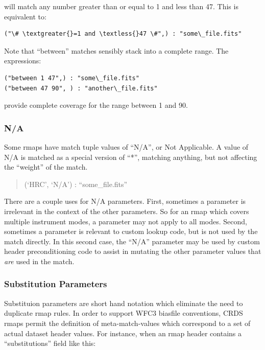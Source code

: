 \documentclass[letterpaper,10pt,english]{sphinxmanual}
\begin{document}
will match any number greater than or equal to 1 and less than 47.   This is
equivalent to:

\begin{Verbatim}[commandchars=\\\{\}]
("\# \textgreater{}=1 and \textless{}47 \#",) : "some\_file.fits"
\end{Verbatim}

Note that ``between'' matches sensibly stack into a complete range.  The expressions:

\begin{Verbatim}[commandchars=\\\{\}]
("between 1 47",) : "some\_file.fits"
("between 47 90", ) : "another\_file.fits"
\end{Verbatim}

provide complete coverage for the range between 1 and 90.


\subsubsection{N/A}
\label{rmap_syntax:n-a}
Some rmaps have match tuple values of ``N/A'',  or Not Applicable.
A value of N/A is matched as a special version of ``*'', matching anything,  but
not affecting the ``weight'' of the match.
\begin{quote}

(`HRC', `N/A') :  ``some\_file.fits''
\end{quote}

There are a couple uses for N/A parameters.    First,  sometimes a parameter is
irrelevant in the context of the other parameters.   So for an rmap which covers
multiple instrument modes,  a parameter may not apply to all modes. Second,
sometimes a parameter is relevant to custom lookup code,  but is not used by the
match directly.  In this second case,   the ``N/A'' parameter may be used by custom
header preconditioning code to assist in mutating the other parameter values
that \emph{are} used in the match.


\subsubsection{Substitution Parameters}
\label{rmap_syntax:substitution-parameters}
Substituion parameters are short hand notation which eliminate the need to
duplicate rmap rules.  In order to support WFC3 biasfile conventions,  CRDS
rmaps permit the definition of meta-match-values which correspond to a set of
actual dataset header values. For instance,  when an rmap header contains a
``substitutions'' field like this:
\end{document}
